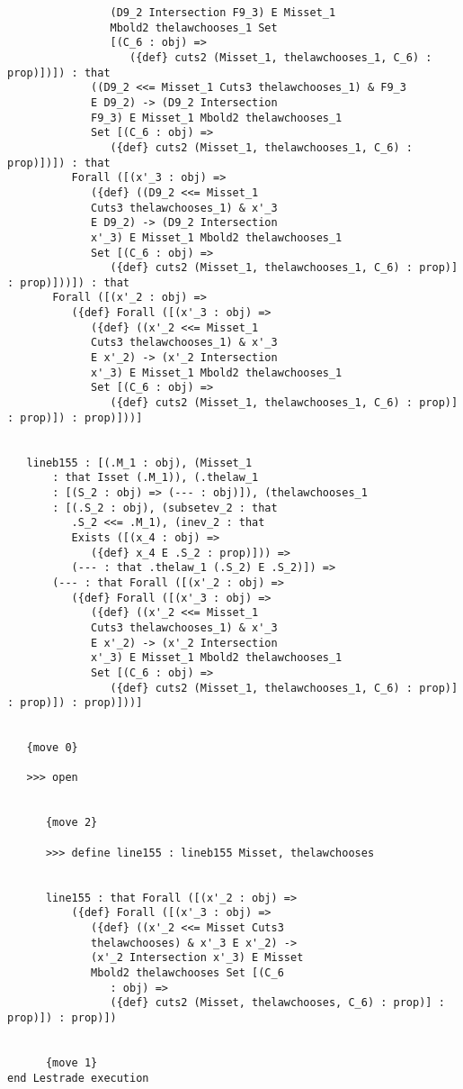 \documentclass[12pt]{article}
\begin{document}
\begin{verbatim}
                (D9_2 Intersection F9_3) E Misset_1 
                Mbold2 thelawchooses_1 Set 
                [(C_6 : obj) => 
                   ({def} cuts2 (Misset_1, thelawchooses_1, C_6) : prop)])]) : that 
             ((D9_2 <<= Misset_1 Cuts3 thelawchooses_1) & F9_3 
             E D9_2) -> (D9_2 Intersection 
             F9_3) E Misset_1 Mbold2 thelawchooses_1 
             Set [(C_6 : obj) => 
                ({def} cuts2 (Misset_1, thelawchooses_1, C_6) : prop)])]) : that 
          Forall ([(x'_3 : obj) => 
             ({def} ((D9_2 <<= Misset_1 
             Cuts3 thelawchooses_1) & x'_3 
             E D9_2) -> (D9_2 Intersection 
             x'_3) E Misset_1 Mbold2 thelawchooses_1 
             Set [(C_6 : obj) => 
                ({def} cuts2 (Misset_1, thelawchooses_1, C_6) : prop)] : prop)]))]) : that 
       Forall ([(x'_2 : obj) => 
          ({def} Forall ([(x'_3 : obj) => 
             ({def} ((x'_2 <<= Misset_1 
             Cuts3 thelawchooses_1) & x'_3 
             E x'_2) -> (x'_2 Intersection 
             x'_3) E Misset_1 Mbold2 thelawchooses_1 
             Set [(C_6 : obj) => 
                ({def} cuts2 (Misset_1, thelawchooses_1, C_6) : prop)] : prop)]) : prop)]))]


   lineb155 : [(.M_1 : obj), (Misset_1 
       : that Isset (.M_1)), (.thelaw_1 
       : [(S_2 : obj) => (--- : obj)]), (thelawchooses_1 
       : [(.S_2 : obj), (subsetev_2 : that 
          .S_2 <<= .M_1), (inev_2 : that 
          Exists ([(x_4 : obj) => 
             ({def} x_4 E .S_2 : prop)])) => 
          (--- : that .thelaw_1 (.S_2) E .S_2)]) => 
       (--- : that Forall ([(x'_2 : obj) => 
          ({def} Forall ([(x'_3 : obj) => 
             ({def} ((x'_2 <<= Misset_1 
             Cuts3 thelawchooses_1) & x'_3 
             E x'_2) -> (x'_2 Intersection 
             x'_3) E Misset_1 Mbold2 thelawchooses_1 
             Set [(C_6 : obj) => 
                ({def} cuts2 (Misset_1, thelawchooses_1, C_6) : prop)] : prop)]) : prop)]))]


   {move 0}

   >>> open


      {move 2}

      >>> define line155 : lineb155 Misset, thelawchooses


      line155 : that Forall ([(x'_2 : obj) => 
          ({def} Forall ([(x'_3 : obj) => 
             ({def} ((x'_2 <<= Misset Cuts3 
             thelawchooses) & x'_3 E x'_2) -> 
             (x'_2 Intersection x'_3) E Misset 
             Mbold2 thelawchooses Set [(C_6 
                : obj) => 
                ({def} cuts2 (Misset, thelawchooses, C_6) : prop)] : prop)]) : prop)])


      {move 1}
end Lestrade execution
\end{verbatim}
\end{document}
